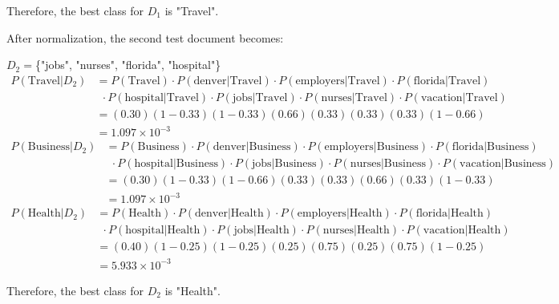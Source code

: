 \documentclass[11pt]{article}
\begin{document}
\begin{enumerate}
        Therefore, the best class for $D_1$ is "Travel".

        After normalization, the second test document becomes:
        
        $D_2=$\{"jobs", "nurses", "florida", "hospital"\}
        \begin{align*}
            P(\text{Travel}|D_2) &= P(\text{Travel}) \cdot P(\text{denver}|\text{Travel}) \cdot P(\text{employers}|\text{Travel}) \cdot P(\text{florida}|\text{Travel}) \\
            & \ \ \cdot P(\text{hospital}|\text{Travel}) \cdot P(\text{jobs}|\text{Travel}) \cdot P(\text{nurses}|\text{Travel}) \cdot P(\text{vacation}|\text{Travel}) \\
            &= (0.30)(1 - 0.33)(1 - 0.33)(0.66)(0.33)(0.33)(0.33)(1 - 0.66) \\
            &= 1.097\times10^{-3}
        \end{align*}
        \begin{align*}
            P(\text{Business}|D_2) &= P(\text{Business}) \cdot P(\text{denver}|\text{Business}) \cdot P(\text{employers}|\text{Business}) \cdot P(\text{florida}|\text{Business}) \\
            & \ \ \cdot P(\text{hospital}|\text{Business}) \cdot P(\text{jobs}|\text{Business}) \cdot P(\text{nurses}|\text{Business}) \cdot P(\text{vacation}|\text{Business}) \\
            &= (0.30)(1 - 0.33)(1 - 0.66)(0.33)(0.33)(0.66)(0.33)(1 - 0.33) \\
            &= 1.097\times10^{-3}
        \end{align*}
        \begin{align*}
            P(\text{Health}|D_2) &= P(\text{Health}) \cdot P(\text{denver}|\text{Health}) \cdot P(\text{employers}|\text{Health}) \cdot P(\text{florida}|\text{Health}) \\
            & \ \ \cdot P(\text{hospital}|\text{Health}) \cdot P(\text{jobs}|\text{Health}) \cdot P(\text{nurses}|\text{Health}) \cdot P(\text{vacation}|\text{Health}) \\
            &= (0.40)(1 - 0.25)(1 - 0.25)(0.25)(0.75)(0.25)(0.75)(1 - 0.25)            \\
            &= 5.933\times10^{-3}
        \end{align*}

        Therefore, the best class for $D_2$ is "Health".

    \end{enumerate}
\end{document}
